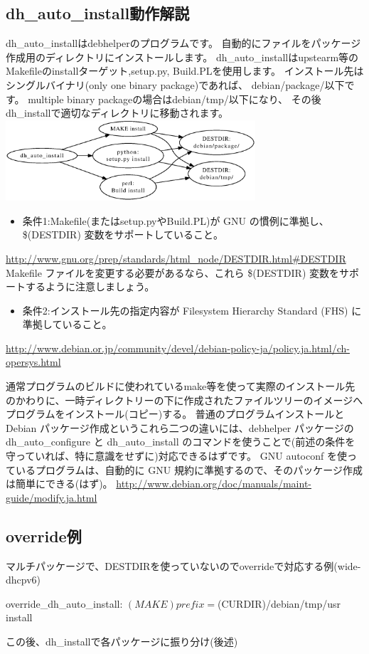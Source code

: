 \documentclass[mingoth,a4paper]{jsarticle}
\begin{document}
\subsection{dh\_auto\_install動作解説}

dh\_auto\_installはdebhelperのプログラムです。
自動的にファイルをパッケージ作成用のディレクトリにインストールします。
dh\_auto\_installはupstearm等のMakefileのinstallターゲット,setup.py,
Build.PLを使用します。
インストール先はシングルバイナリ(only one binary package)であれば、
debian/package/以下です。
multiple binary packageの場合はdebian/tmp/以下になり、
その後dh\_installで適切なディレクトリに移動されます。
\includegraphics[height=3cm]{image201303/dh_auto_install1.eps}

\begin{itemize}
\item 条件1:Makefile(またはsetup.pyやBuild.PL)が GNU の慣例に準拠し、\$(DESTDIR) 変数をサポートしていること。
\end{itemize}
\url{http://www.gnu.org/prep/standards/html\_node/DESTDIR.html\#DESTDIR}
\\
Makefile ファイルを変更する必要があるなら、これら \$(DESTDIR) 変数をサポートするように注意しましょう。
\begin{itemize}
\item 条件2:インストール先の指定内容が Filesystem Hierarchy Standard (FHS) に準拠していること。
\end{itemize}
\url{http://www.debian.or.jp/community/devel/debian-policy-ja/policy.ja.html/ch-opersys.html}

通常プログラムのビルドに使われているmake等を使って実際のインストール先のかわりに、一時ディレクトリーの下に作成されたファイルツリーのイメージへプログラムをインストール(コピー)する。
 普通のプログラムインストールとDebian パッケージ作成というこれら二つの違いには、debhelper パッケージの dh\_auto\_configure と dh\_auto\_install のコマンドを使うことで(前述の条件を守っていれば、特に意識をせずに)対応できるはずです。
GNU autoconf を使っているプログラムは、自動的に GNU 規約に準拠するので、そのパッケージ作成は簡単にできる(はず)。
\url{http://www.debian.org/doc/manuals/maint-guide/modify.ja.html}


\subsection[containsverbatim]{override例}
マルチパッケージで、DESTDIRを使っていないのでoverrideで対応する例(wide-dhcpv6)
\begin{commandline}
override_dh_auto_install:
        $(MAKE) prefix=$(CURDIR)/debian/tmp/usr install
\end{commandline}
この後、dh\_installで各パッケージに振り分け(後述)
\end{document}
